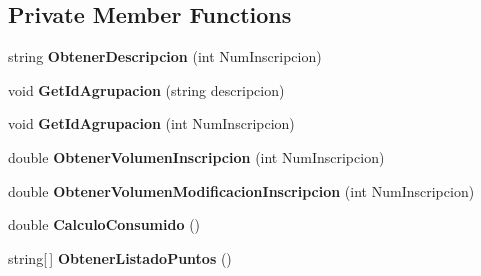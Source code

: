 \subsection*{Private Member Functions}
\begin{DoxyCompactItemize}
\item 
string {\bfseries Obtener\+Descripcion} (int Num\+Inscripcion)\hypertarget{class_sica_segura_1_1_s_i_c_a___agrupacion_aca48cdcfca7b1e05a22614c12763789b}{}\label{class_sica_segura_1_1_s_i_c_a___agrupacion_aca48cdcfca7b1e05a22614c12763789b}

\item 
void {\bfseries Get\+Id\+Agrupacion} (string descripcion)\hypertarget{class_sica_segura_1_1_s_i_c_a___agrupacion_aee9e0bab250e667510859cca1099a48b}{}\label{class_sica_segura_1_1_s_i_c_a___agrupacion_aee9e0bab250e667510859cca1099a48b}

\item 
void {\bfseries Get\+Id\+Agrupacion} (int Num\+Inscripcion)\hypertarget{class_sica_segura_1_1_s_i_c_a___agrupacion_a9ae2949f22cfabad0de6afaaaba42fe5}{}\label{class_sica_segura_1_1_s_i_c_a___agrupacion_a9ae2949f22cfabad0de6afaaaba42fe5}

\item 
double {\bfseries Obtener\+Volumen\+Inscripcion} (int Num\+Inscripcion)\hypertarget{class_sica_segura_1_1_s_i_c_a___agrupacion_ac92f985644358f261d457f9e3e392e60}{}\label{class_sica_segura_1_1_s_i_c_a___agrupacion_ac92f985644358f261d457f9e3e392e60}

\item 
double {\bfseries Obtener\+Volumen\+Modificacion\+Inscripcion} (int Num\+Inscripcion)\hypertarget{class_sica_segura_1_1_s_i_c_a___agrupacion_af27cdef8d7aa9679082b4960411b19f7}{}\label{class_sica_segura_1_1_s_i_c_a___agrupacion_af27cdef8d7aa9679082b4960411b19f7}

\item 
double {\bfseries Calculo\+Consumido} ()\hypertarget{class_sica_segura_1_1_s_i_c_a___agrupacion_a0304a161f999ad2106ad23503f5eeb91}{}\label{class_sica_segura_1_1_s_i_c_a___agrupacion_a0304a161f999ad2106ad23503f5eeb91}

\item 
string\mbox{[}$\,$\mbox{]} {\bfseries Obtener\+Listado\+Puntos} ()\hypertarget{class_sica_segura_1_1_s_i_c_a___agrupacion_acce508bfad81c4d54b47f2ffe9a547d6}{}\label{class_sica_segura_1_1_s_i_c_a___agrupacion_acce508bfad81c4d54b47f2ffe9a547d6}

\end{DoxyCompactItemize}
